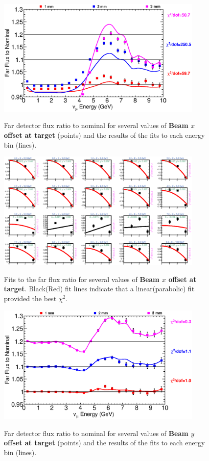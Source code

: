 \begin{figure}[ht]
  \begin{center}
    {\includegraphics[width=4.0in]{figures/NominalX_far_summary.eps}}
  \end{center}
\caption{ Far detector flux ratio to nominal for several values of {\bf Beam $x$ offset at target} (points) and the results of the fits to each energy bin (lines).}
\end{figure}

\begin{figure}[hb]
  \begin{center}
    {\includegraphics[width=4.0in]{figures/NominalX_far_fits.eps}}
  \end{center}
\caption{ Fits to the far flux ratio for several values of {\bf Beam $x$ offset at target}. Black(Red) fit lines indicate that a linear(parabolic) fit provided the best $\chi^2$. }
\end{figure}

\begin{figure}[ht]
  \begin{center}
    {\includegraphics[width=4.0in]{figures/NominalY_far_summary.eps}}
  \end{center}
\caption{ Far detector flux ratio to nominal for several values of {\bf Beam $y$ offset at target} (points) and the results of the fits to each energy bin (lines).}
\end{figure}

